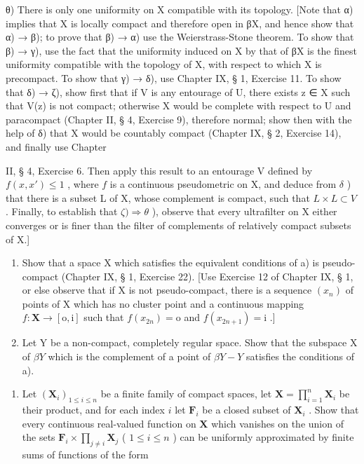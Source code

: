 θ) There is only one uniformity on X compatible with its topology. {[}Note that α) implies that X is locally compact and therefore open in βX, and hence show that α) → β); to prove that β) → α) use the Weierstrass-Stone theorem. To show that β) → γ), use the fact that the uniformity induced on X by that of βX is the finest uniformity compatible with the topology of X, with respect to which X is precompact. To show that γ) → δ), use Chapter IX, § 1, Exercise 11. To show that δ) → ζ), show first that if V is any entourage of U, there exists z ∈ X such that V(z) is not compact; otherwise X would be complete with respect to U and paracompact (Chapter II, § 4, Exercise 9), therefore normal; show then with the help of δ) that X would be countably compact (Chapter IX, § 2, Exercise 14), and finally use Chapter

II, § 4, Exercise 6. Then apply this result to an entourage V defined by \(f(x, x') \leqslant 1\) , where \(f\) is a continuous pseudometric on X, and deduce from \(\delta\) ) that there is a subset L of X, whose complement is compact, such that \(L \times L \subset V\) . Finally, to establish that \(\zeta) \Longrightarrow \theta\) ), observe that every ultrafilter on X either converges or is finer than the filter of complements of relatively compact subsets of X.{]}

\begin{enumerate}
\def\labelenumi{\alph{enumi})}
\setcounter{enumi}{1}
\item
  Show that a space X which satisfies the equivalent conditions of a) is pseudo-compact (Chapter IX, § 1, Exercise 22). {[}Use Exercise 12 of Chapter IX, § 1, or else observe that if X is not pseudo-compact, there is a sequence \((x_{n})\) of points of X which has no cluster point and a continuous mapping \(f: \mathbf{X} \to [\mathrm{o}, \mathrm{i}]\) such that \(f(x_{2n}) = \mathrm{o}\) and \(f(x_{2n+1}) = \mathrm{i}\) .{]}
\item
  Let Y be a non-compact, completely regular space. Show that the subspace X of \(\beta Y\) which is the complement of a point of \(\beta Y - Y\) satisfies the conditions of a).
\end{enumerate}

\begin{enumerate}
\def\labelenumi{\arabic{enumi})}
\setcounter{enumi}{7}
\tightlist
\item
  Let \((\mathbf{X}_i)_{1\leqslant i\leqslant n}\) be a finite family of compact spaces, let \(\mathbf{X} = \prod_{i=1}^{n}\mathbf{X}_i\) be their product, and for each index \(i\) let \(\mathbf{F}_i\) be a closed subset of \(\mathbf{X}_i\) . Show that every continuous real-valued function on \(\mathbf{X}\) which vanishes on the union of the sets \(\mathbf{F}_i\times \prod_{j\neq i}\mathbf{X}_j\) ( \(1\leqslant i\leqslant n\) ) can be uniformly approximated by finite sums of functions of the form
\end{enumerate}

